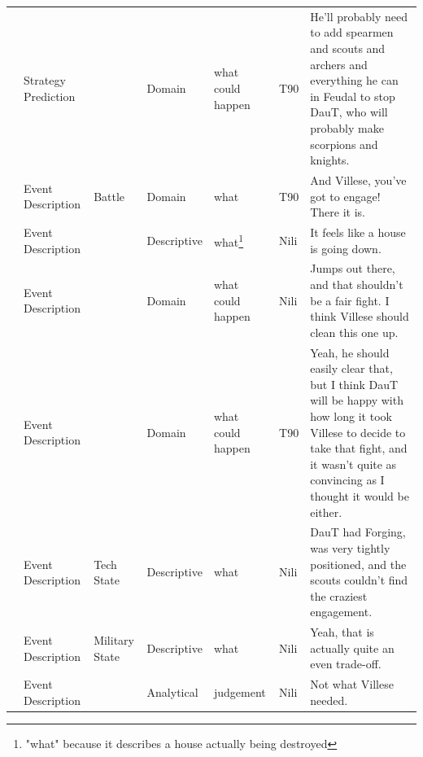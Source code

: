 {\begin{longtable}{@{}>{\theAppRow}r|L{2.3cm}L{2.2cm}L{1.4cm}L{2.2cm}L{0.5cm}U{5.6cm}@{}}
    & Strategy Prediction   &                      & Domain      & what could happen & T90     & He'll probably need to add spearmen and scouts and archers and everything he can in Feudal to stop DauT, who will probably make scorpions and knights.                                                                   \\
    & Event Description     & Battle               & Domain      & what              & T90     & And Villese, you've got to engage! There it is.                                                                                                                                                                          \\
    & Event Description     &                      & Descriptive   & what\footnote{"what" because it describes a house actually being destroyed}                & Nili    & It feels like a house is going down.                                                                                                                                                                                   \\
    & Event Description     &                      & Domain      & what could happen & Nili    & Jumps out there, and that shouldn't be a fair fight. I think Villese should clean this one up.                                                                                                                           \\
    & Event Description     &                      & Domain      & what could happen & T90     & Yeah, he should easily clear that, but I think DauT will be happy with how long it took Villese to decide to take that fight, and it wasn't quite as convincing as I thought it would be either.                         \\
    & Event Description     & Tech State           & Descriptive   & what              & Nili    & DauT had Forging, was very tightly positioned, and the scouts couldn't find the craziest engagement.                                                                                                                     \\
    & Event Description     & Military State       & Descriptive   & what              & Nili    & Yeah, that is actually quite an even trade-off.                                                                                                                                                                          \\
    & Event Description     &                      & Analytical  & judgement         & Nili    & Not what Villese needed.                                                                                                                                                                                                 \\

\end{longtable}}
